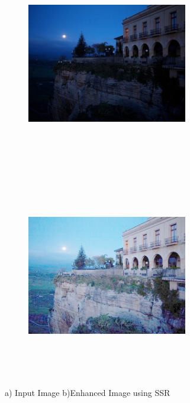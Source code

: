 \begin{figure}
	\begin{subfigure}{8cm}
		\centering    
    	\includegraphics[width=7cm,height=9cm,keepaspectratio]{images/ch5/palace_input.jpg}
    	\caption{} 
    \end{subfigure}
  	\begin{subfigure}{6cm}
  		\centering
  		\includegraphics[width=7cm,height=9cm,keepaspectratio]{images/ch5/palace_ssr.jpg}
   		\caption{}
  	\end{subfigure}
  	\caption{a) Input Image b)Enhanced Image using SSR}
  	\label{fig:ssrPalace}
\end{figure}



